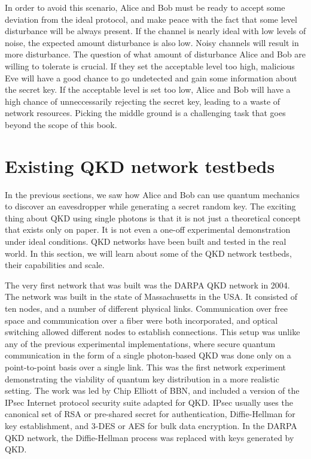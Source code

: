 In order to avoid this scenario, Alice and Bob must be ready to accept some deviation from the ideal protocol, and make peace with the fact that some level disturbance will be always present.
If the channel is nearly ideal with low levels of noise, the expected amount disturbance is also low.
Noisy channels will result in more disturbance.
The question of what amount of disturbance Alice and Bob are willing to tolerate is crucial.
If they set the acceptable level too high, malicious Eve will have a good chance to go undetected and gain some information about the secret key.
If the acceptable level is set too low, Alice and Bob will have a high chance of unneccessarily rejecting the secret key, leading to a waste of network resources.
Picking the middle ground is a challenging task that goes beyond the scope of this book.





\section{Existing QKD network testbeds}
\label{sec:existing-qkd-networks}


In the previous sections, we saw how Alice and Bob can use quantum mechanics to discover an eavesdropper while generating a secret random key.
The exciting thing about QKD using single photons is that it is not just a theoretical concept that exists only on paper.
It is not even a one-off experimental demonstration under ideal conditions.
QKD networks have been built and tested in the real world.
In this section, we will learn about some of the QKD network testbeds, their capabilities and scale.

The very first network that was built was the DARPA QKD network in 2004.
The network was built in the state of Massachusetts in the USA.
It consisted of ten nodes, and a number of different physical links.
Communication over free space and communication over a fiber were both incorporated, and optical switching allowed different nodes to establish connections.
This setup was unlike any of the previous experimental implementations, where secure quantum communication in the form of a single photon-based QKD was done only on a point-to-point basis over a single link.
This was the first network experiment demonstrating the viability of quantum key distribution in a more realistic setting.
The work was led by Chip Elliott of BBN, and included a version of the IPsec Internet protocol security suite adapted for QKD.
IPsec usually uses the canonical set of RSA or pre-shared secret for authentication, Diffie-Hellman for key establishment, and 3-DES or AES for bulk data encryption.  In the DARPA QKD network, the Diffie-Hellman process was replaced with keys generated by QKD.

